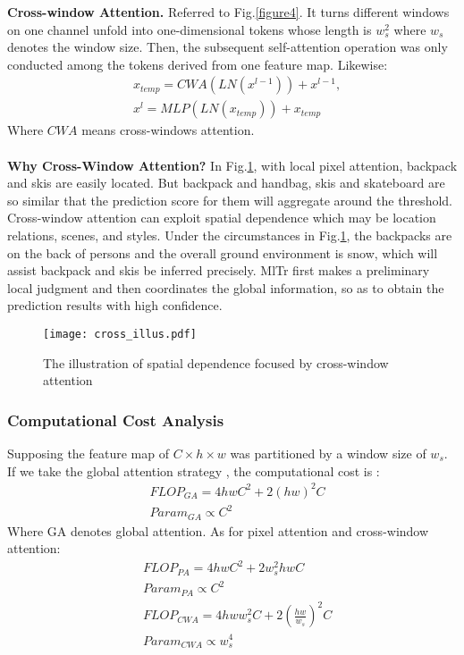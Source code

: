 \documentclass{article} \usepackage[numbers,sort&compress]{natbib}
\begin{document}
\textbf{Cross-window Attention.} Referred to Fig.\textcolor{red}{\ref{figure4}}. It turns different windows on one channel unfold into one-dimensional tokens whose length is $w_s^2$ where $w_s$ denotes the window size. Then, the subsequent self-attention operation was only conducted among the tokens derived from one feature map. Likewise:
\begin{align}
& x_{temp} = CWA(LN(x^{l-1})) + x^{l-1},\\
& x^l = MLP(LN(x_{temp})) + x_{temp}
\end{align}
Where $CWA$ means cross-windows attention.\\\\
\textbf{Why Cross-Window Attention?} 
In Fig.\ref{cross_illus}, with local pixel attention, backpack and skis are easily located. But backpack and handbag, skis and skateboard are so similar that the prediction score for them will aggregate around the threshold. Cross-window attention can exploit spatial dependence which may be location relations, scenes, and styles. Under the circumstances in Fig.\ref{cross_illus},  the backpacks are on the back of persons and the overall ground environment is snow, which will assist backpack and skis be inferred precisely. MlTr first makes a preliminary local judgment and then coordinates the global information, so as to obtain the prediction results with high confidence.
\begin{figure}[h]
\begin{center}
\texttt{[image: cross\_illus.pdf]}
\caption{The illustration of spatial dependence focused by cross-window attention}
\label{cross_illus}
\end{center}
\end{figure}
\subsubsection{Computational Cost Analysis}
\label{compute_cost}
Supposing the feature map of $C\times h\times w$ was partitioned by a window size of $w_s$. If we take the global attention strategy \cite{vaswani2017attention}, the computational cost is \cite{liu2021swin, han2021transformer}:
\begin{eqnarray}
 &FLOP_{GA} = 4hwC^2 + 2(hw)^2C \\
 &Param_{GA} \propto C^2     
\end{eqnarray}
Where GA denotes global attention. As for pixel attention and cross-window attention:
\begin{eqnarray}
 &FLOP_{PA} = 4hwC^2 + 2w_{s}^2hwC\\
 &Param_{PA} \propto C^2 \\
 &FLOP_{CWA} = 4hww_s^2C+2(\frac{hw}{w_s})^2C \\
 &Param_{CWA} \propto w_s^4 \ \
\end{eqnarray}
\end{document}
